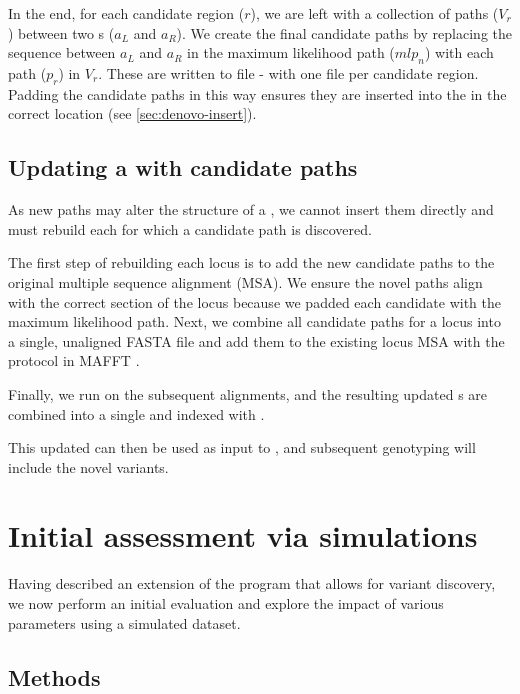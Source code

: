 \hspace{0.75cm}

\noindent
In the end, for each candidate region ($r$), we are left with a collection of paths ($V_r$) between two \kmer{}s ($a_L$ and $a_R$). We create the final candidate paths by replacing the sequence between $a_L$ and $a_R$ in the maximum likelihood path ($mlp_n$) with each path ($p_r$) in $V_r$. These are written to file - with one file per candidate region. Padding the candidate paths in this way ensures they are inserted into the \prg{} in the correct location (see \autoref{sec:denovo-insert}). 


\subsection{Updating a \panrg{} with candidate paths}
\label{sec:denovo-insert}

As new paths may alter the structure of a \prg{}, we cannot insert them directly and must rebuild each \prg{} for which a candidate path is discovered.

The first step of rebuilding each locus \prg{} is to add the new candidate paths to the original multiple sequence alignment (MSA). We ensure the novel paths align with the correct section of the locus because we padded each candidate with the maximum likelihood path. Next, we combine all candidate paths for a locus into a single, unaligned FASTA file and add them to the existing locus MSA with the  protocol in MAFFT \cite{katoh2012}. 

Finally, we run \makeprg{} on the subsequent alignments, and the resulting updated \prg{}s are combined into a single \panrg{} and indexed with \pandora{}. 

This updated \panrg{} can then be used as input to \pandora{}, and subsequent genotyping will include the novel variants.

\section{Initial assessment via simulations}
\label{sec:denovo-sims}
Having described an extension of the \pandora{} program that allows for \denovo{} variant discovery, we now perform an initial evaluation and explore the impact of various parameters using a simulated dataset.

\subsection{Methods}
\label{sec:denovo-sims-methods}

